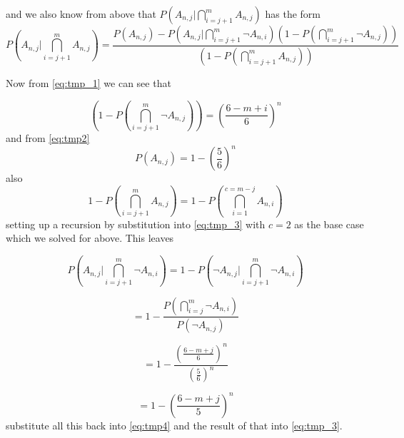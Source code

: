 \documentclass[12pt,a4paper]{article}
\begin{document}
and we also know from above that $P\left(A_{n,j}|\bigcap_{i=j+1}^m A_{n,j}\right)$ has the form
\begin{equation}
P\left(A_{n,j}|\bigcap_{i=j+1}^m A_{n,j}\right) = \frac{P(A_{n,j}) - P(A_{n,j} | \bigcap_{i=j+1}^m \neg A_{n,i})\left(1-P\left(\bigcap_{i=j+1}^m \neg A_{n,j}\right)\right)}{\left(1-P\left(\bigcap_{i=j+1}^m A_{n,j}\right)\right)}
\label{eq:tmp4}
\end{equation}

Now from \cref{eq:tmp_1} we can see that

\begin{equation}
\left( 1-P\left(\bigcap_{i=j+1}^m \neg A_{n,j}\right) \right) = \left(\frac{6-m+i}{6}\right)^n
\end{equation}
and from \cref{eq:tmp2}
\begin{equation}
P(A_{n,j}) = 1-\left( \frac{5}{6} \right)^n
\end{equation}
also
\begin{equation}
1-P\left(\bigcap_{i=j+1}^m A_{n,j}\right) = 1-P\left(\bigcap_{i=1}^{c=m-j} A_{n,i}\right)
\end{equation}
setting up a recursion by substitution into \cref{eq:tmp_3} with $c=2$ as the base case which we solved for above. This leaves

\begin{equation}
P(A_{n,j} | \bigcap_{i=j+1}^m \neg A_{n,i}) = 1 - P(\neg A_{n,j} | \bigcap_{i=j+1}^m \neg A_{n,i})
\end{equation}

\begin{equation}
= 1- \frac{P(\bigcap_{i=j}^m \neg A_{n,i})}{P(\neg A_{n,j})}
\end{equation}

\begin{equation}
= 1- \frac{\left(\frac{6-m+j}{6}\right)^n}{\left(\frac{5}{6}\right)^n}
\end{equation}

\begin{equation}
= 1- \left(\frac{6-m+j}{5}\right)^n
\end{equation}
substitute all this back into \cref{eq:tmp4} and the result of that into \cref{eq:tmp_3}.
\end{document}
